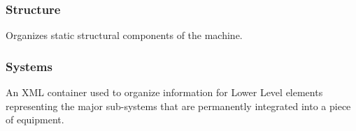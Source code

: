 \FloatBarrier

\subsubsection{Structure}
  \label{sec:Structure}



Organizes static structural components of the machine.

\FloatBarrier

\subsubsection{Systems}
  \label{sec:Systems}



An XML container used to organize information for \gls{Lower Level} elements representing the major sub-systems that are permanently integrated into a piece of equipment.

\FloatBarrier
